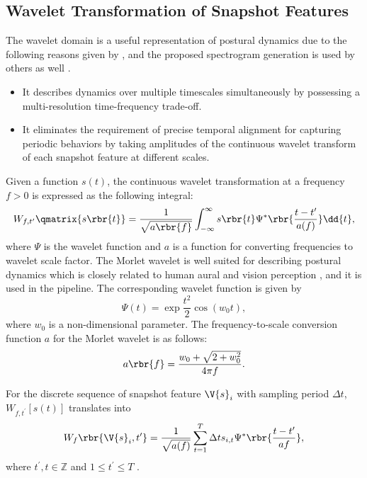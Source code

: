 \subsection{Wavelet Transformation of Snapshot Features}
The wavelet domain is a useful representation of postural dynamics due to the following reasons given by \citet{berman_mapping_2014}, and the proposed spectrogram generation is used by others as well \citep{marshall_continuous_2021, todd_systematic_2017}.
\begin{itemize}
	\item It describes dynamics over multiple timescales simultaneously by possessing a multi-resolution time-frequency trade-off.
	\item It eliminates the requirement of precise temporal alignment for capturing periodic behaviors by taking amplitudes of the continuous wavelet transform of each snapshot feature at different scales.
\end{itemize}
Given a function $s(t)$, the continuous wavelet transformation at a frequency $f>0$ is expressed as the following integral:
\begin{equation}
	W_{f,t^{\prime}}\qmatrix{s\rbr{t}} = \frac{1}{\sqrt{a\rbr{f}}} \int_{-\infty}^{\infty} s\rbr{t} \Psi^\ast\rbr{\frac{t - t^{\prime}}{a(f)}} \dd{t},
\end{equation}
where $\Psi$ is the wavelet function and $a$ is a function for converting frequencies to wavelet scale factor.
The Morlet wavelet is  well suited for describing postural dynamics which is closely related to human aural and vision perception  \citep{daugman_uncertainty_1985}, and it is used in the pipeline.
The corresponding wavelet function is given by
\begin{equation}
	\Psi(t) = \exp{\frac{t^2}{2}} \cos(w_0t),
\end{equation}
where $w_0$ is a non-dimensional parameter. The frequency-to-scale conversion function $a$ for the Morlet wavelet is as follows:
\begin{equation}
	a\rbr{f} = \frac{w_0 + \sqrt{2+w_0^2}}{4 \pi f}.
\end{equation}

For the discrete sequence of snapshot feature $\V{s}_i$ with sampling period $\Delta t$, $W_{f,t^\prime}[s(t)]$ translates into
\begin{equation}
	\label{eq:wavelet-practical}
	W_f\rbr{\V{s}_i, t^\prime} = \frac{1}{\sqrt{a(f)}} \sum_{t=1}^{T} {\Delta t} s_{i,t} \Psi^\ast\rbr{\frac{t-t^{\prime}}{a{f}}},
\end{equation}
where $t^\prime, t \in \mathbb{Z}$ and $ 1 \leq t^\prime \leq T$ \citep{torrence_practical_1998}.

